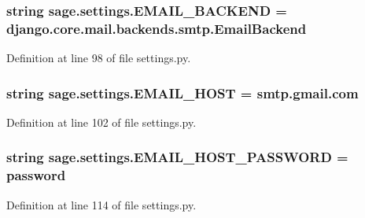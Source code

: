 \subsubsection[{E\+M\+A\+I\+L\+\_\+\+B\+A\+C\+K\+E\+N\+D}]{\setlength{\rightskip}{0pt plus 5cm}string sage.\+settings.\+E\+M\+A\+I\+L\+\_\+\+B\+A\+C\+K\+E\+N\+D = \textquotesingle{}django.\+core.\+mail.\+backends.\+smtp.\+Email\+Backend\textquotesingle{}}\label{a00043_a2d83ca0a279480aa03599465a0386b17}


Definition at line 98 of file settings.\+py.

\hypertarget{a00043_a594329fe15c9680f523afaab779411ed}{}
\subsubsection[{E\+M\+A\+I\+L\+\_\+\+H\+O\+S\+T}]{\setlength{\rightskip}{0pt plus 5cm}string sage.\+settings.\+E\+M\+A\+I\+L\+\_\+\+H\+O\+S\+T = \textquotesingle{}smtp.\+gmail.\+com\textquotesingle{}}\label{a00043_a594329fe15c9680f523afaab779411ed}


Definition at line 102 of file settings.\+py.

\hypertarget{a00043_a66e7a16ed6b0df5716a6579fcba949a6}{}
\subsubsection[{E\+M\+A\+I\+L\+\_\+\+H\+O\+S\+T\+\_\+\+P\+A\+S\+S\+W\+O\+R\+D}]{\setlength{\rightskip}{0pt plus 5cm}string sage.\+settings.\+E\+M\+A\+I\+L\+\_\+\+H\+O\+S\+T\+\_\+\+P\+A\+S\+S\+W\+O\+R\+D = \textquotesingle{}password\textquotesingle{}}\label{a00043_a66e7a16ed6b0df5716a6579fcba949a6}


Definition at line 114 of file settings.\+py.

\hypertarget{a00043_a9c01855359753a3c3f517341806347c2}{}
